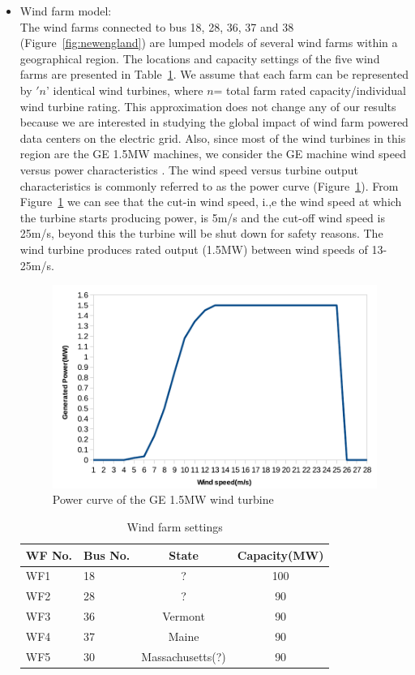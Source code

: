 \begin{itemize}
\item{Wind farm model: \\
The wind farms connected to bus 18, 28, 36, 37 and 38 (Figure~\ref{fig:newengland}) are lumped models of several wind farms within a geographical region. The locations and capacity settings of the five wind farms are presented in Table~\ref{tab:wf_setting}. We assume that each farm can be represented by $'n$' identical wind turbines, where $n$= total farm rated capacity/individual wind turbine rating. This approximation does not change any of our results because we are interested in studying the global impact of wind farm powered data centers on the electric grid. Also, since most of the wind turbines in this region are the GE 1.5MW machines, we consider the GE machine wind speed versus power characteristics \cite{lei2006modeling}. The wind speed versus turbine output characteristics is commonly referred to as the power curve (Figure~\ref{fig:windcurve}). From Figure~\ref{fig:windcurve} we can see that the cut-in wind speed, i.,e the wind speed at which the turbine starts producing power, is 5m/s and the cut-off wind speed is 25m/s, beyond this the turbine will be shut down for safety reasons. The wind turbine produces rated output (1.5MW) between wind speeds of 13-25m/s.
\begin{figure}[ht]
\centering
\includegraphics[width=1\columnwidth]{img/wind_curve.pdf}
\caption{Power curve of the GE 1.5MW wind turbine}
\label{fig:windcurve}
\end{figure}


\begin{table}[ht]
\begin{center}
\caption{Wind farm settings}
\begin{tabular}{|l|l|c|c|}
\hline
WF No. & Bus No. & State & Capacity(MW) \\
\hline
WF1 & 18& ? & 100\\
WF2 & 28& ? & 90 \\
WF3 & 36& Vermont & 90  \\
WF4 & 37& Maine & 90\\
WF5 & 30& Massachusetts(?) & 90\\
\hline

\end{tabular}
   \vspace{.05in}
\label{tab:wf_setting}
\end{center}
\end{table}
}
\end{itemize}
